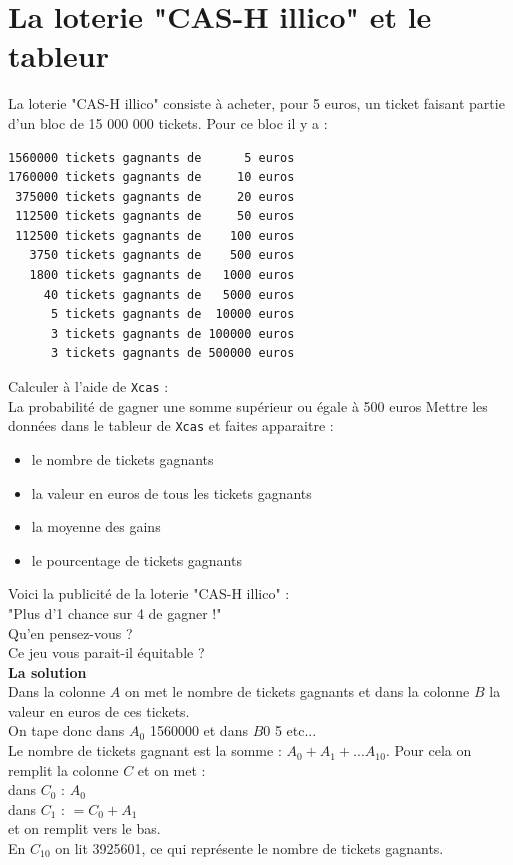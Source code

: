 \documentclass[a4paper,11pt]{book}
\begin{document}
\section{La loterie "CAS-H illico" et le tableur}
La loterie "CAS-H illico" consiste \`a acheter, pour 5 euros, un ticket 
faisant partie d'un bloc de 15 000 000 tickets. Pour ce bloc il y a :
\begin{verbatim}
1560000 tickets gagnants de      5 euros 
1760000 tickets gagnants de     10 euros 
 375000 tickets gagnants de     20 euros 
 112500 tickets gagnants de     50 euros 
 112500 tickets gagnants de    100 euros 
   3750 tickets gagnants de    500 euros 
   1800 tickets gagnants de   1000 euros 
     40 tickets gagnants de   5000 euros 
      5 tickets gagnants de  10000 euros 
      3 tickets gagnants de 100000 euros  
      3 tickets gagnants de 500000 euros 
\end{verbatim}
Calculer \`a l'aide  de {\tt Xcas} :\\
La probabilit\'e de gagner une somme sup\'erieur ou \'egale \`a 500 euros 
Mettre les donn\'ees dans le tableur de {\tt Xcas} et faites apparaitre :
\begin{itemize}
\item le nombre de tickets gagnants
\item la valeur en euros de tous les tickets gagnants
\item la moyenne des gains
\item le pourcentage de tickets gagnants
\end{itemize}
Voici la publicit\'e de la loterie "CAS-H illico" :\\
"Plus d'1 chance sur 4 de gagner !"\\
Qu'en pensez-vous ?\\
Ce jeu vous parait-il \'equitable ?\\

{\bf La solution}\\
Dans la colonne $A$ on met le nombre de tickets gagnants et dans 
la colonne $B$ la valeur en euros de ces tickets.\\
On tape donc dans $A_0$ 1560000 et dans $B0$ 5 etc...\\ 
Le nombre de tickets gagnant est la somme : $A_0+A_1+... A_{10}$.
Pour cela on remplit la colonne $C$ et on met :\\
dans $C_0$ : $A_0$\\
dans $C_1$ : $=C_0+A_1$\\
et on remplit vers le bas.\\
En $C_{10}$ on lit 3925601, ce qui repr\'esente le nombre de tickets gagnants.\\
\end{document}
